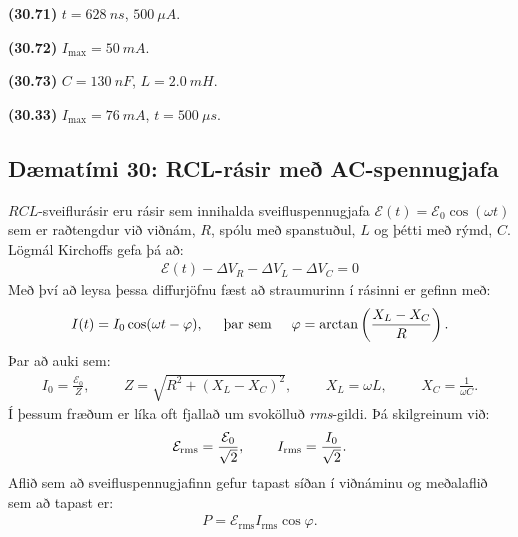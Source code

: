 \begin{tcolorbox}
\begin{enumerate*}[label = ]
  \item \textbf{(30.71)} $t = \SI{628}{ns}$, $\SI{500}{\mu A}$.
  \item \textbf{(30.72)} $I_{\text{max}} = \SI{50}{mA}$.
  \item \textbf{(30.73)} $C = \SI{130}{nF}$, $L = \SI{2.0}{mH}$. \\
  \item \textbf{(30.33)} $I_{\text{max}} = \SI{76}{mA}$, $t = \SI{500}{\mu s}$.
\end{enumerate*}
\end{tcolorbox}

\newpage

\subsection*{Dæmatími 30: RCL-rásir með AC-spennugjafa}

\begin{tcolorbox}
$RCL$-sveiflurásir eru rásir sem innihalda sveifluspennugjafa $\mathcal{E}(t) = \mathcal{E}_0\cos(\omega t)$ sem er raðtengdur við viðnám, $R$, spólu með spanstuðul, $L$ og þétti með rýmd, $C$. Lögmál Kirchoffs gefa þá að:
\begin{align*}
    \mathcal{E}(t) - \Delta V_R - \Delta V_L - \Delta V_C = 0
\end{align*}
Með því að leysa þessa diffurjöfnu fæst að straumurinn í rásinni er gefinn með:
\begin{align*}
    I(t) = I_0 \cos(\omega t - \varphi), \hspace{0.5cm} \text{þar sem} \hspace{0.5cm} \varphi = \arctan\left(\frac{X_L-X_C}{R}\right).
\end{align*}
Þar að auki sem:
\begin{align*}
    I_0 = \frac{\mathcal{E}_0}{Z}, \hspace{1cm} Z = \sqrt{R^2 + (X_L - X_C)^2}, \hspace{1cm} X_L = \omega L, \hspace{1cm} X_C = \frac{1}{\omega C}.
\end{align*}
Í þessum fræðum er líka oft fjallað um svokölluð \emph{rms}-gildi. Þá skilgreinum við:
\begin{align*}
    \mathcal{E}_{\text{rms}} = \frac{\mathcal{E}_0}{\sqrt{2}}, \hspace{0.8cm} I_{\text{rms}} = \frac{I_0}{\sqrt{2}}.
\end{align*}
Aflið sem að sveifluspennugjafinn gefur tapast síðan í viðnáminu og meðalaflið sem að tapast er:
\begin{align*}
    P = \mathcal{E}_{\text{rms}} I_{\text{rms}} \cos\varphi.
\end{align*}
\end{tcolorbox}

